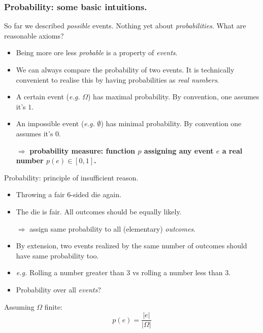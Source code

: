 \documentclass{beamer}
\begin{document}
\begin{frame}
  \frametitle{Probability: some basic intuitions.}
  So far we described \emph{possible} events. Nothing yet about \emph{probabilities}. What are reasonable axioms?

  \begin{itemize}
  \item Being more ore less \emph{probable} is a property of \emph{events}.
  \item We can always compare the probability of two events. It is technically convenient to realise this by having probabilities as \emph{real numbers}.
  \item A certain event (\emph{e.g.} $\Omega$) has maximal probability. By convention, one assumes it's $1$.
  \item An impossible event (\emph{e.g.} $\emptyset$) has minimal probability. By convention one assumes it's $0$.
  \item[$\Rightarrow$] {\bf probability measure: function $p$ assigning any event $e$ a real number $p(e) \in [0, 1]$.}
  \end{itemize}
\end{frame}

\begin{frame}{Probability: principle of insufficient reason.}
    \begin{itemize}
    \item Throwing a fair $6$-sided die again.
    \item The die is fair. All outcomes should be equally likely.
    \item [$\Rightarrow$] assign same probability to all (elementary) \emph{outcomes}.
    \item By extension, two events realized by the same number of outcomes should have same probability too.
    \item {\color{darkgreen} \emph{e.g.} Rolling a number greater than $3$ vs rolling a number less than $3$.}
    \item  Probability over all \emph{events}?
    \end{itemize}

    Assuming $\Omega$ finite:
    \[ p(e) = \frac{|e|}{|\Omega|} \] 
\end{frame}
\end{document}
